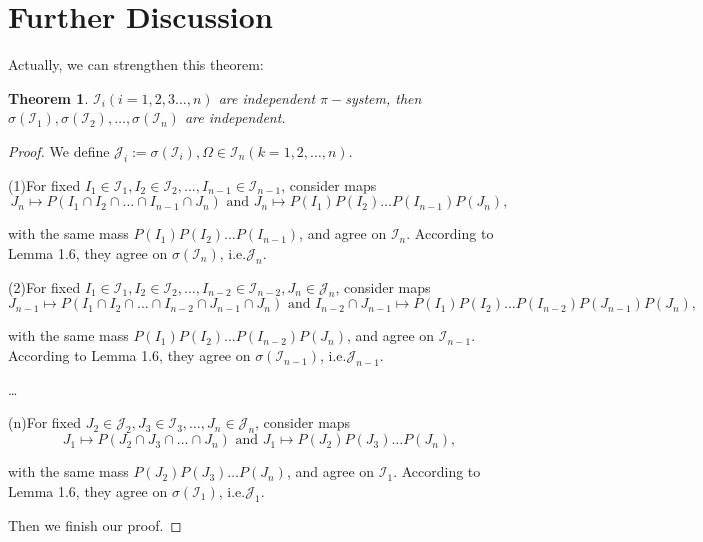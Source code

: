 \documentclass[12pt]{article}
\newtheorem{theorem}{Theorem}
\begin{document}
\section{Further Discussion}
Actually, we can strengthen this theorem:
	\begin{theorem}
		$\mathcal I_i(i = 1,2,3\dots,n)$ are independent  $\pi-$system, then $\sigma(\mathcal I_1), \sigma(\mathcal I_2),\dots,\sigma(\mathcal I_n)$ are independent.
	\end{theorem}
	\begin{proof}
		We define $\mathcal J_i := \sigma(\mathcal I_i),\Omega\in \mathcal I_n(k = 1,2,\dots,n).$  
		
		(1)For fixed $I_1\in \mathcal I_1, I_2\in \mathcal I_2,\dots, I_{n-1}\in \mathcal I_{n-1}$, consider maps
		$$J_{n}\mapsto P(I_1\cap I_2\cap \dots\cap I_{n-1}\cap J_{n}) \text{ and } J_{n}\mapsto P(I_1)P(I_2)\dots P(I_{n-1})P(J_{n}),$$
		
		with the same mass $P(I_1)P(I_2)\dots P(I_{n-1})$, and agree on $\mathcal I_{n}$. According to Lemma 1.6, they agree on $\sigma(\mathcal I_{n})$, i.e.$\mathcal J_{n}$.
		
		(2)For fixed $I_1\in \mathcal I_1, I_2\in \mathcal I_2,\dots, I_{n-2}\in \mathcal I_{n-2},J_{n}\in\mathcal J_{n}$, consider maps
		$$J_{n-1}\mapsto P(I_1\cap I_2\cap \dots\cap I_{n-2}\cap J_{n-1}\cap J_{n}) \text{ and } I_{n-2}\cap J_{n-1}\mapsto P(I_1)P(I_2)\dots P(I_{n-2})P(J_{n-1})P(J_{n}),$$
		
		with the same mass $P(I_1)P(I_2)\dots P(I_{n-2})P(J_{n})$, and agree on $\mathcal I_{n-1}$. According to Lemma 1.6, they agree on $\sigma(\mathcal I_{n-1})$, i.e.$\mathcal J_{n-1}$.
		
		\dots
		
		(n)For fixed $J_2\in \mathcal J_2, J_3\in \mathcal I_3,\dots, J_{n}\in\mathcal J_{n}$, consider maps
		$$J_{1}\mapsto P(J_2\cap J_3\cap \dots\cap J_{n}) \text{ and } J_{1}\mapsto P(J_2)P(J_3)\dots P(J_{n}),$$
		
		with the same mass $P(J_2)P(J_3)\dots P(J_{n})$, and agree on $\mathcal I_{1}$. According to Lemma 1.6, they agree on $\sigma(\mathcal I_{1})$, i.e.$\mathcal J_{1}$.
		
		Then we finish our proof.
		
	\end{proof}
\end{document}
